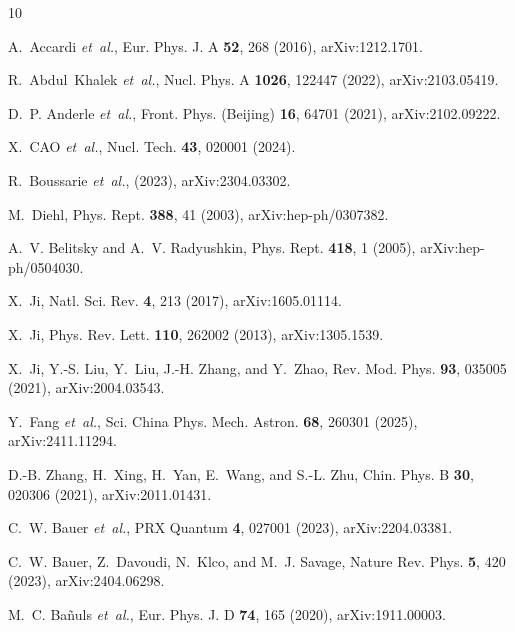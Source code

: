 \documentclass[aps,prd,twocolumn,superscriptaddress,notitlepage,nofootinbib,preprintnumbers]{revtex4-1}
\begin{document}
\normalem
%   
%

\begin{thebibliography}{10}

A.~Accardi {\em et~al.},
\newblock Eur. Phys. J. A {\bf 52}, 268 (2016), arXiv:1212.1701.

R.~Abdul~Khalek {\em et~al.},
\newblock Nucl. Phys. A {\bf 1026}, 122447 (2022), arXiv:2103.05419.

D.~P. Anderle {\em et~al.},
\newblock Front. Phys. (Beijing) {\bf 16}, 64701 (2021), arXiv:2102.09222.

X.~CAO {\em et~al.},
\newblock Nucl. Tech. {\bf 43}, 020001 (2024).

R.~Boussarie {\em et~al.},
\newblock (2023), arXiv:2304.03302.

M.~Diehl,
\newblock Phys. Rept. {\bf 388}, 41 (2003), arXiv:hep-ph/0307382.

A.~V. Belitsky and A.~V. Radyushkin,
\newblock Phys. Rept. {\bf 418}, 1 (2005), arXiv:hep-ph/0504030.

X.~Ji,
\newblock Natl. Sci. Rev. {\bf 4}, 213 (2017), arXiv:1605.01114.

X.~Ji,
\newblock Phys. Rev. Lett. {\bf 110}, 262002 (2013), arXiv:1305.1539.

X.~Ji, Y.-S. Liu, Y.~Liu, J.-H. Zhang, and Y.~Zhao,
\newblock Rev. Mod. Phys. {\bf 93}, 035005 (2021), arXiv:2004.03543.

Y.~Fang {\em et~al.},
\newblock Sci. China Phys. Mech. Astron. {\bf 68}, 260301 (2025),
  arXiv:2411.11294.

D.-B. Zhang, H.~Xing, H.~Yan, E.~Wang, and S.-L. Zhu,
\newblock Chin. Phys. B {\bf 30}, 020306 (2021), arXiv:2011.01431.

C.~W. Bauer {\em et~al.},
\newblock PRX Quantum {\bf 4}, 027001 (2023), arXiv:2204.03381.

C.~W. Bauer, Z.~Davoudi, N.~Klco, and M.~J. Savage,
\newblock Nature Rev. Phys. {\bf 5}, 420 (2023), arXiv:2404.06298.

M.~C. Ba{\~n}uls {\em et~al.},
\newblock Eur. Phys. J. D {\bf 74}, 165 (2020), arXiv:1911.00003.


\end{thebibliography}
\end{document}

